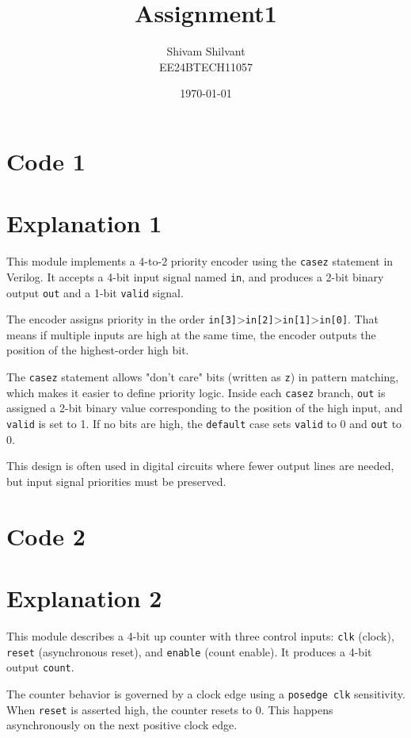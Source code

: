 \documentclass{article}
\title{Assignment1}
\author{Shivam Shilvant\\EE24BTECH11057}
\date{\today}
\begin{document}
\maketitle


\section*{Code 1}


\section*{Explanation 1}
This module implements a 4-to-2 priority encoder using the \texttt{casez} statement in Verilog. It accepts a 4-bit input signal named \texttt{in}, and produces a 2-bit binary output \texttt{out} and a 1-bit \texttt{valid} signal.

The encoder assigns priority in the order \texttt{in[3]}\textgreater\texttt{in[2]}\textgreater\texttt{in[1]}\textgreater\texttt{in[0]}. That means if multiple inputs are high at the same time, the encoder outputs the position of the highest-order high bit.

The \texttt{casez} statement allows "don’t care" bits (written as \texttt{z}) in pattern matching, which makes it easier to define priority logic. Inside each \texttt{casez} branch, \texttt{out} is assigned a 2-bit binary value corresponding to the position of the high input, and \texttt{valid} is set to 1. If no bits are high, the \texttt{default} case sets \texttt{valid} to 0 and \texttt{out} to 0.

This design is often used in digital circuits where fewer output lines are needed, but input signal priorities must be preserved.

\section*{Code 2}


\section*{Explanation 2}This module describes a 4-bit up counter with three control inputs: \texttt{clk} (clock), \texttt{reset} (asynchronous reset), and \texttt{enable} (count enable). It produces a 4-bit output \texttt{count}.

The counter behavior is governed by a clock edge using a \texttt{posedge clk} sensitivity. When \texttt{reset} is asserted high, the counter resets to 0. This happens asynchronously on the next positive clock edge.
\end{document}
